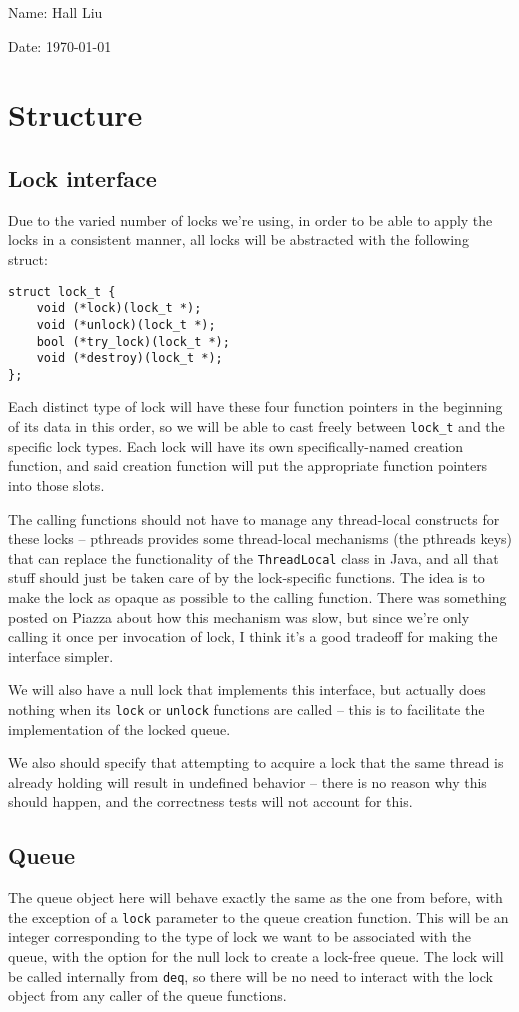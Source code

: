 \documentclass{article}
\begin{document}
Name: Hall Liu

Date: \today 
\vspace{1.5cm}

\section*{Structure}
\subsection*{Lock interface}
Due to the varied number of locks we're using, in order to be able to apply the locks in a consistent manner, all locks will be abstracted with the following struct:
\begin{verbatim}
struct lock_t {
    void (*lock)(lock_t *);
    void (*unlock)(lock_t *);
    bool (*try_lock)(lock_t *);
    void (*destroy)(lock_t *);
};
\end{verbatim}
Each distinct type of lock will have these four function pointers in the beginning of its data in this order, so we will be able to cast freely between \verb|lock_t| and the specific lock types. Each lock will have its own specifically-named creation function, and said creation function will put the appropriate function pointers into those slots. 

The calling functions should not have to manage any thread-local constructs for these locks -- pthreads provides some thread-local mechanisms (the pthreads keys) that can replace the functionality of the \verb|ThreadLocal| class in Java, and all that stuff should just be taken care of by the lock-specific functions. The idea is to make the lock as opaque as possible to the calling function. There was something posted on Piazza about how this mechanism was slow, but since we're only calling it once per invocation of lock, I think it's a good tradeoff for making the interface simpler.

We will also have a null lock that implements this interface, but actually does nothing when its \verb|lock| or \verb|unlock| functions are called -- this is to facilitate the implementation of the locked queue.

We also should specify that attempting to acquire a lock that the same thread is already holding will result in undefined behavior -- there is no reason why this should happen, and the correctness tests will not account for this.
\subsection*{Queue}
The queue object here will behave exactly the same as the one from before, with the exception of a \verb|lock| parameter to the queue creation function. This will be an integer corresponding to the type of lock we want to be associated with the queue, with the option for the null lock to create a lock-free queue. The lock will be called internally from \verb|deq|, so there will be no need to interact with the lock object from any caller of the queue functions. 
\end{document}

